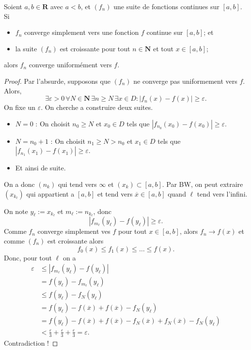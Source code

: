\begin{theorem}
Soient $a,b\in \mathbf{R}$ avec $a<b$, et $(f_{n})$ une suite de fonctions continues sur $[a,b]$. Si
\begin{itemize}
\item $f_{n}$ converge simplement vers une fonction $f$ continue sur $[a,b]$; et
\item la suite $(f_{n})$ est croissante pour tout $n\in \mathbf{N}$ et tout $x \in[a,b]$; 
\end{itemize}
alors $f_{n}$ converge uniformément vers $f$.
\end{theorem}
\begin{proof}
Par l'absurde, supposons que $(f_{n})$ ne converge pas uniformement vers $f$. Alors,
$$
\exists\varepsilon>0\,\forall N\in \mathbf{N}\,\exists n\ge N\,\exists x \in D:|f_{n}(x)-f(x)|\ge \varepsilon.
$$
On fixe un $\varepsilon$. On cherche a construire deux suites.
\begin{itemize}
\item $N=0$ : On choisit $n_{0}\ge N$ et $x_{0}\in D$ tels que $|f_{n_{0}}(x_{0})-f(x_{0})|\ge \varepsilon$.
\item $N=n_{0}+1$ : On choisit $n_{1}\ge N>n_{0}$ et $x_{1}\in D$ tels que $|f_{n_{1}}(x_{1})-f(x_{1})|\ge \varepsilon$.
\item Et ainsi de suite.
\end{itemize}
On a donc $(n_{k})$ qui tend vers $\infty$ et $(x_{k})\subset[a,b]$. Par BW, on peut extraire $(x_{k_{\ell}})$ qui appartient a $[a,b]$ et tend vers $\overline{x}\in[a,b]$ quand $\ell$ tend vers l'infini.

On note $y_{\ell}:=x_{k_{\ell}}$ et $m_{\ell}:=n_{k_{\ell}}$, donc
$$
|f_{m_{\ell}}(y_{\ell})-f(y_{\ell})|\ge \varepsilon.
$$
Comme $f_{n}$ converge simplement ves $f$ pour tout $x \in[a,b]$, alors $f_{n}\to f(x)$ et comme $(f_{n})$ est croissante alors
$$
f_{0}(x)\le f_{1}(x)\le \dots\le f(x).
$$
Donc, pour tout $\ell$ on a
\begin{align*}
\varepsilon & \le |f_{m_{\ell}}(y_{\ell})-f(y_{\ell})| \\
 & =f(y_{\ell})-f_{m_{\ell}}(y_{\ell}) \\
 & \le f(y_{\ell})-f_{N}(y_{\ell}) \\
 & = f(y_{\ell})-f(\overline{x})+f(\overline{x})-f_{N}(y_{\ell}) \\
 & = f(y_{\ell})-f(\overline{x})+f(\overline{x})-f_{N}(\overline{x})+f_{N}(\overline{x})-f_{N}(y_{\ell}) \\
 & < \frac{\varepsilon}{3}+\frac{\varepsilon}{3}+\frac{\varepsilon}{3}=\varepsilon.
\end{align*}
Contradiction !
\end{proof}

